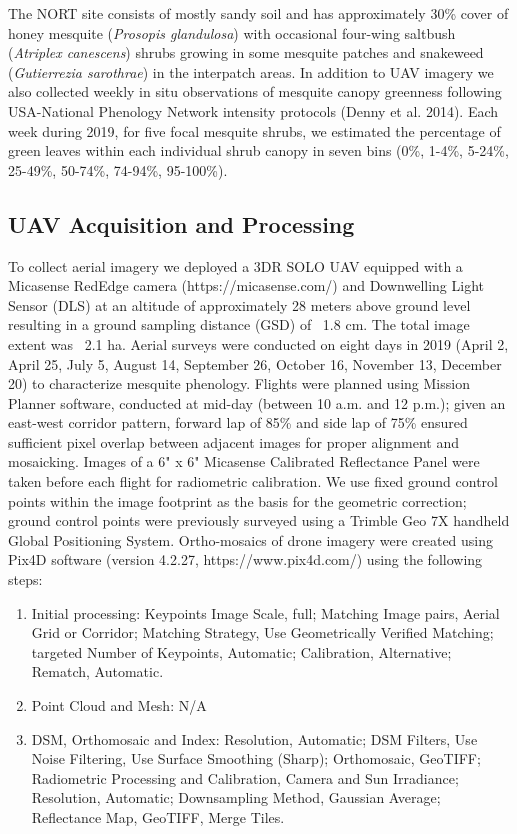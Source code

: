 \documentclass{article}
\begin{document}
The NORT site consists of mostly sandy soil and has approximately 30\% cover of honey mesquite (\textit{Prosopis glandulosa}) with occasional four-wing saltbush (\textit{Atriplex canescens}) shrubs growing in some mesquite patches and snakeweed (\textit{Gutierrezia sarothrae}) in the interpatch areas. In addition to UAV imagery we also collected weekly in situ observations of mesquite canopy greenness following USA-National Phenology Network intensity protocols (Denny et al. 2014). Each week during 2019, for five focal mesquite shrubs, we estimated the percentage of green leaves within each individual shrub canopy in seven bins (0\%, 1-4\%, 5-24\%, 25-49\%, 50-74\%, 74-94\%, 95-100\%).

\subsection{UAV Acquisition and Processing}

To collect aerial imagery we deployed a 3DR SOLO UAV equipped with a Micasense RedEdge camera (https://micasense.com/) and Downwelling Light Sensor (DLS) at an altitude of approximately 28 meters above ground level resulting in a ground sampling distance (GSD) of ~1.8 cm. The total image extent was ~2.1 ha.
Aerial surveys were conducted on eight days in 2019 (April 2, April 25, July 5, August 14, September 26, October 16, November 13, December 20) to characterize mesquite phenology. Flights were planned using Mission Planner software, conducted at mid-day (between 10 a.m. and 12 p.m.); given an east-west corridor pattern, forward lap of 85\% and side lap of 75\% ensured sufficient pixel overlap between adjacent images for proper alignment and mosaicking.
Images of a 6" x 6" Micasense Calibrated Reflectance Panel were taken before each flight for radiometric calibration. We use fixed ground control points within the image footprint as the basis for the geometric correction; ground control points were previously surveyed using a Trimble Geo 7X handheld Global Positioning System. 
Ortho-mosaics of drone imagery were created using Pix4D software (version 4.2.27, https://www.pix4d.com/) using the following steps:
\begin{enumerate}
    \item Initial processing: Keypoints Image Scale, full; Matching Image pairs, Aerial Grid or Corridor; Matching Strategy, Use Geometrically Verified Matching; targeted Number of Keypoints, Automatic; Calibration, Alternative; Rematch, Automatic.
    \item Point Cloud and Mesh: N/A
    \item DSM, Orthomosaic and Index: Resolution, Automatic; DSM Filters, Use Noise Filtering, Use Surface Smoothing (Sharp); Orthomosaic, GeoTIFF; Radiometric Processing and Calibration, Camera and Sun Irradiance; Resolution, Automatic; Downsampling Method, Gaussian Average; Reflectance Map, GeoTIFF, Merge Tiles.
\end{enumerate}
\end{document}

